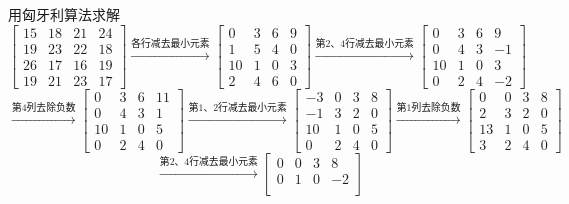 \begin{solution}
    用匈牙利算法求解
    $$\begin{bmatrix}
        15 & 18 & 21 & 24\\
        19 & 23 & 22 & 18\\
        26 & 17 & 16 & 19\\
        19 & 21 & 23 & 17
    \end{bmatrix}
    \xrightarrow{\text{各行减去最小元素}}
    \begin{bmatrix}
        0  & 3  & 6  & 9 \\
        1  & 5  & 4  & 0 \\
        10 & 1  & 0  & 3 \\
        2  & 4  & 6  & 0
    \end{bmatrix}
    \xrightarrow{\text{第2、4行减去最小元素}}
    \begin{bmatrix}
        0  & 3  & 6  & 9 \\
        0  & 4  & 3  & -1\\
        10 & 1  & 0  & 3 \\
        0  & 2  & 4  & -2
    \end{bmatrix}$$
    $$
    \xrightarrow{\text{第4列去除负数}}
    \begin{bmatrix}
        0  & 3  & 6  & 11\\
        0  & 4  & 3  & 1 \\
        10 & 1  & 0  & 5 \\
        0  & 2  & 4  & 0
    \end{bmatrix}
    \xrightarrow{\text{第1、2行减去最小元素}}
    \begin{bmatrix}
        -3 & 0  & 3  & 8 \\
        -1 & 3  & 2  & 0 \\
        10 & 1  & 0  & 5 \\
        0  & 2  & 4  & 0
    \end{bmatrix}
    \xrightarrow{\text{第1列去除负数}}
    \begin{bmatrix}
        0  & 0  & 3  & 8 \\
        2  & 3  & 2  & 0 \\
        13 & 1  & 0  & 5 \\
        3  & 2  & 4  & 0
    \end{bmatrix}$$
    $$
    \xrightarrow{\text{第2、4行减去最小元素}}
    \begin{bmatrix}
        0  & 0  & 3  & 8 \\
        0  & 1  & 0  & -2\\

\end{bmatrix}$$
\end{solution}
